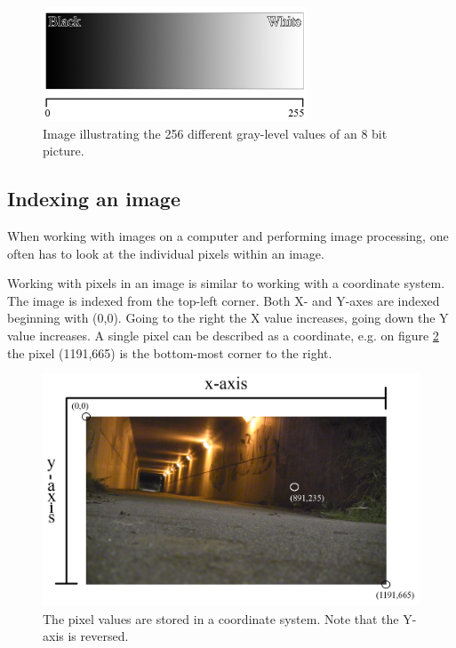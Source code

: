 \begin{figure}[htbp]
\centering
\includegraphics[width=0.7\textwidth]{Pictures/Theory/Grayscale.jpg}
\caption{Image illustrating the 256 different gray-level values of an 8 bit picture.}
\label{fig:ip_grayscale}
\end{figure}
 
\subsection{Indexing an image}
When working with images on a computer and performing image processing, one often has to look at the individual pixels within an image.

Working with pixels in an image is similar to working with a coordinate system. The image is indexed from the top-left corner. Both X- and Y-axes are indexed beginning with (0,0). Going to the right the X value increases, going down the Y value increases. A single pixel can be described as a coordinate, e.g. on figure \ref{fig:ip_IndexingAPicture} the pixel (1191,665) is the bottom-most corner to the right.

\begin{figure}[htbp]
\centering
\includegraphics[width=1.00\textwidth]{Pictures/Theory/IndexingAPicture}
\caption{The pixel values are stored in a coordinate system. Note that the Y-axis is reversed.}
\label{fig:ip_IndexingAPicture}
\end{figure}

